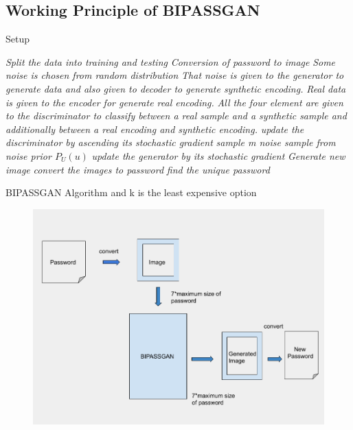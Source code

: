 \documentclass[runningheads]{llncs}
\begin{document}
{\subsection{Working Principle of BIPASSGAN}
\begin{algorithm*}[H]
\caption{Setup}
\label{algo:pre}
\begin{algorithmic}[1]
    \STATE \emph{Split the data into training and testing}
    \STATE \emph{Conversion of password to image}
            \STATE \emph{Some noise is chosen from random distribution}
            \STATE \emph{That noise is given to the generator to generate data
 and also given to decoder to generate synthetic encoding.}
            \STATE \emph{Real data is given to the encoder for generate real encoding.}
            \STATE \emph{All the four element are given to the discriminator to classify between a real sample and a synthetic sample and additionally between a real encoding and synthetic encoding.
 }
            \STATE \emph{update the discriminator by ascending its stochastic gradient}
        \ENDFOR
        \STATE \emph{sample m noise sample from noise prior ${P_U(u)}$}
        \STATE \emph{update the generator by its stochastic gradient}
    \ENDFOR
    \STATE \emph{Generate new image}
    \STATE \emph{convert the images to password}
    \STATE \emph{find the unique password}
    
    
 \caption{BIPASSGAN Algorithm and k is the least expensive option}    
\end{algorithmic}
\end{algorithm*}

\begin{figure}
\centering

\includegraphics[width=5in]{vc.png}


\end{figure}}
\end{document}
